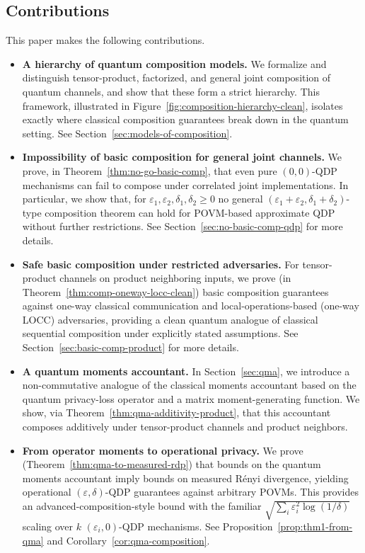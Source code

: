 \documentclass[11pt]{article}
\theoremstyle{plain}
\theoremstyle{remark}
\newcommand{\edit}[1]{{\color{black} #1}}
\begin{document}
\subsection{Contributions}

This paper makes the following contributions.

\begin{itemize}
  \item \textbf{A hierarchy of quantum composition models.}
  We formalize and distinguish tensor-product, factorized, and general joint composition of quantum channels, and show that these form a strict hierarchy.
  This framework, illustrated in Figure~\ref{fig:composition-hierarchy-clean},
  isolates exactly where classical composition guarantees break down in the quantum setting. See Section~\ref{sec:models-of-composition}.

  \item \textbf{Impossibility of basic composition for general joint channels.}
  We prove, in Theorem~\ref{thm:no-go-basic-comp}, that even pure $(0,0)$-QDP mechanisms can fail to compose under correlated joint implementations.
  In particular, we show that, for $\varepsilon_1,\varepsilon_2,\delta_1,\delta_2\geq 0$ no general $(\varepsilon_1+\varepsilon_2,\delta_1+\delta_2)$-type composition theorem can hold for POVM-based approximate QDP without further restrictions.
  See Section~\ref{sec:no-basic-comp-qdp} for more details.

  \item \textbf{Safe basic composition under restricted adversaries.}
  For tensor-product channels on product neighboring inputs, we prove (in Theorem~\ref{thm:comp-oneway-locc-clean}) basic composition guarantees against \edit{one-way classical communication and local-operations-based (one-way LOCC)} adversaries, providing a clean quantum analogue of classical sequential composition under explicitly stated assumptions.
  See Section~\ref{sec:basic-comp-product} for more details.

  \item \textbf{A quantum moments accountant.}
  In Section~\ref{sec:qma}, we introduce a non-commutative analogue of the classical moments accountant based on the quantum privacy-loss operator and a matrix moment-generating function.
  We show, via Theorem~\ref{thm:qma-additivity-product}, that this accountant composes additively under tensor-product channels and product neighbors.

  \item \textbf{From operator moments to operational privacy.}
  We prove (Theorem~\ref{thm:qma-to-measured-rdp}) that bounds on the quantum moments accountant imply bounds on measured R\'enyi divergence, yielding operational $(\varepsilon,\delta)$-QDP guarantees against arbitrary POVMs.
  This provides an advanced-composition-style bound with the familiar $\sqrt{\sum_i \varepsilon_i^2 \log(1/\delta)}$ scaling over
  $k$ $(\varepsilon_i, 0)$-QDP mechanisms. See Proposition~\ref{prop:thm1-from-qma} and Corollary~\ref{cor:qma-composition}.


\end{itemize}
\end{document}
